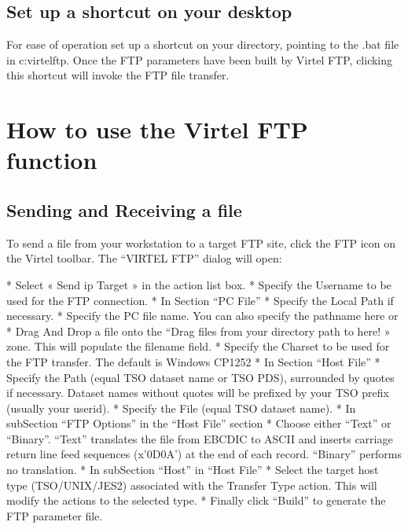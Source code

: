\documentclass[letterpaper,10pt,english]{sphinxmanual}
\begin{document}
\subsection{Set up a shortcut on your desktop}
\label{\detokenize{Customization:set-up-a-shortcut-on-your-desktop}}
\sphinxAtStartPar
For ease of operation set up a shortcut on your directory, pointing to the .bat file in c:virtelftp. Once the FTP parameters have been built by Virtel FTP, clicking this shortcut will invoke the FTP file transfer.


\section{How to use the Virtel FTP function}
\label{\detokenize{Customization:how-to-use-the-virtel-ftp-function}}

\subsection{Sending and Receiving a file}
\label{\detokenize{Customization:sending-and-receiving-a-file}}
\sphinxAtStartPar
To send a file from your workstation to a target FTP site, click the FTP icon on the Virtel toolbar. The “VIRTEL FTP” dialog will open:

\sphinxAtStartPar
{}

\sphinxAtStartPar
{}

\begin{sphinxVerbatim}[commandchars=\\\{\}]
*   Select « Send ip Target » in the action list box.
*   Specify the Username to be used for the FTP connection.
*   In Section “PC File”
*   Specify the Local Path if necessary.
*   Specify the PC file name. You can also specify the pathname here or \PYGZhy{}
*   Drag And Drop a file onto the “Drag files from your directory path to here! » zone. This will populate the filename field.
*   Specify the Charset to be used for the FTP transfer. The default is Windows CP\PYGZhy{}1252
*   In Section “Host File”
*   Specify the Path (equal TSO dataset name or TSO PDS), surrounded by quotes if necessary. Dataset names without quotes will be prefixed by your TSO prefix (usually your userid).
*   Specify the File (equal TSO dataset name).
*   In sub\PYGZhy{}Section “FTP Options” in the “Host File” section
*   Choose either “Text” or “Binary”. “Text” translates the file from EBCDIC to ASCII and inserts carriage return line feed sequences (x’0D0A’) at the end of each record. “Binary” performs no translation.
*   In sub\PYGZhy{}Section “Host” in “Host File”
*   Select the target host type (TSO/UNIX/JES2) associated with the \PYGZdq{}Transfer Type\PYGZdq{} action. This will modify the actions to the selected type.
*   Finally click “Build” to generate the FTP parameter file.
\end{sphinxVerbatim}
\end{document}
